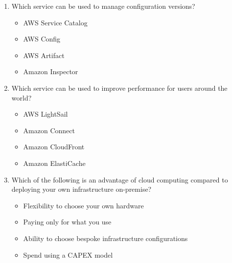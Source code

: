 \begin{enumerate}
	\item Which service can be used to manage configuration versions?
	\begin{itemize}
		\item AWS Service Catalog
		\item AWS Config
		\item AWS Artifact
		\item Amazon Inspector
	\end{itemize}

	\item Which service can be used to improve performance for users around the world?
	\begin{itemize}
		\item AWS LightSail
		\item Amazon Connect
		\item Amazon CloudFront
		\item Amazon ElastiCache
	\end{itemize}

	\item Which of the following is an advantage of cloud computing compared to deploying your own infrastructure on-premise?
	\begin{itemize}
		\item Flexibility to choose your own hardware
		\item Paying only for what you use
		\item Ability to choose bespoke infrastructure configurations
		\item Spend using a CAPEX model
	\end{itemize}

\end{enumerate}